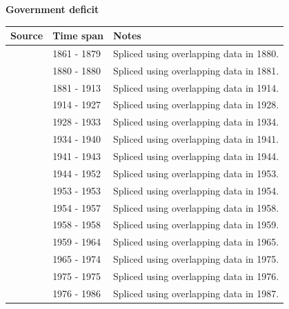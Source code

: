 \documentclass[12pt,a4paper,landscape]{article}
\begin{document}
\begin{adjustbox}{max totalsize={\paperwidth}{\paperheight},center}
\begin{minipage}[t][\textheight][t]{\textwidth}
\vspace*{0.5cm}
{}
\begin{center}
{\Large\bfseries Government deficit}
\end{center}
\vspace{0.5cm}
\begin{table}[H]
\centering
\small
\begin{tabular}{|l|l|l|}
\hline
\textbf{Source} & \textbf{Time span} & \textbf{Notes} \\
\hline
\rowcolor{white}\cite{Mitchell}& 1861 - 1879 &Spliced using overlapping data in 1880. \\
\rowcolor{lightgray}\cite{FZ}& 1880 - 1880 &Spliced using overlapping data in 1881. \\
\rowcolor{white}\cite{IMF_FPP}& 1881 - 1913 &Spliced using overlapping data in 1914. \\
\rowcolor{lightgray}\cite{Mitchell}& 1914 - 1927 &Spliced using overlapping data in 1928. \\
\rowcolor{white}\cite{IMF_FPP}& 1928 - 1933 &Spliced using overlapping data in 1934. \\
\rowcolor{lightgray}\cite{Mitchell}& 1934 - 1940 &Spliced using overlapping data in 1941. \\
\rowcolor{white}\cite{IMF_FPP}& 1941 - 1943 &Spliced using overlapping data in 1944. \\
\rowcolor{lightgray}\cite{Mitchell}& 1944 - 1952 &Spliced using overlapping data in 1953. \\
\rowcolor{white}\cite{IMF_FPP}& 1953 - 1953 &Spliced using overlapping data in 1954. \\
\rowcolor{lightgray}\cite{Mitchell}& 1954 - 1957 &Spliced using overlapping data in 1958. \\
\rowcolor{white}\cite{IMF_FPP}& 1958 - 1958 &Spliced using overlapping data in 1959. \\
\rowcolor{lightgray}\cite{Mitchell}& 1959 - 1964 &Spliced using overlapping data in 1965. \\
\rowcolor{white}\cite{IMF_FPP}& 1965 - 1974 &Spliced using overlapping data in 1975. \\
\rowcolor{lightgray}\cite{Mitchell}& 1975 - 1975 &Spliced using overlapping data in 1976. \\
\rowcolor{white}\cite{IMF_FPP}& 1976 - 1986 &Spliced using overlapping data in 1987. \\

\end{tabular}
\end{table}
\end{minipage}
\end{adjustbox}
\end{document}
